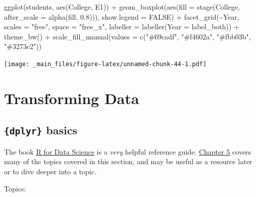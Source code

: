 \documentclass[
]{book}
\newenvironment{Shaded}{\begin{snugshade}}{\end{snugshade}}
\newcommand{\AttributeTok}[1]{\textcolor[rgb]{0.77,0.63,0.00}{#1}}
\newcommand{\ConstantTok}[1]{\textcolor[rgb]{0.00,0.00,0.00}{#1}}
\newcommand{\FloatTok}[1]{\textcolor[rgb]{0.00,0.00,0.81}{#1}}
\newcommand{\FunctionTok}[1]{\textcolor[rgb]{0.00,0.00,0.00}{#1}}
\newcommand{\NormalTok}[1]{#1}
\newcommand{\SpecialCharTok}[1]{\textcolor[rgb]{0.00,0.00,0.00}{#1}}
\newcommand{\StringTok}[1]{\textcolor[rgb]{0.31,0.60,0.02}{#1}}
\begin{document}
\begin{Shaded}
\begin{Highlighting}[]
\FunctionTok{ggplot}\NormalTok{(students, }\FunctionTok{aes}\NormalTok{(College, E1)) }\SpecialCharTok{+}
  \FunctionTok{geom\_boxplot}\NormalTok{(}\FunctionTok{aes}\NormalTok{(}\AttributeTok{fill =} \FunctionTok{stage}\NormalTok{(College, }\AttributeTok{after\_scale =} \FunctionTok{alpha}\NormalTok{(fill, }\FloatTok{0.8}\NormalTok{))), }\AttributeTok{show.legend =} \ConstantTok{FALSE}\NormalTok{) }\SpecialCharTok{+}
  \FunctionTok{facet\_grid}\NormalTok{(}\SpecialCharTok{\textasciitilde{}}\NormalTok{Year, }\AttributeTok{scales =} \StringTok{"free"}\NormalTok{, }\AttributeTok{space =} \StringTok{"free\_x"}\NormalTok{, }\AttributeTok{labeller =} \FunctionTok{labeller}\NormalTok{(}\AttributeTok{Year =}\NormalTok{ label\_both)) }\SpecialCharTok{+}
  \FunctionTok{theme\_bw}\NormalTok{() }\SpecialCharTok{+}
  \FunctionTok{scale\_fill\_manual}\NormalTok{(}\AttributeTok{values =} \FunctionTok{c}\NormalTok{(}\StringTok{"\#69cadf"}\NormalTok{, }\StringTok{"\#f4602a"}\NormalTok{, }\StringTok{"\#fbb03b"}\NormalTok{, }\StringTok{"\#3273c2"}\NormalTok{))}
\end{Highlighting}
\end{Shaded}

\texttt{[image: \_main\_files/figure-latex/unnamed-chunk-44-1.pdf]}

\hypertarget{transforming-data}{%
\chapter{Transforming Data}\label{transforming-data}}

\hypertarget{dplyr-basics}{%
\section*{\texorpdfstring{\texttt{\{dplyr\}} basics}{\{dplyr\} basics}}\label{dplyr-basics}}

The book \href{https://r4ds.had.co.nz/}{R for Data Science} is a \emph{very} helpful reference guide. \href{https://r4ds.had.co.nz/transform.html}{Chapter 5} covers many of the topics covered in this section, and may be useful as a resource later or to dive deeper into a topic.

Topics:
\end{document}
